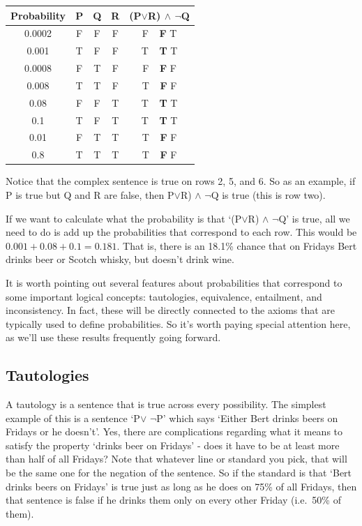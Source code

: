 \documentclass[]{tufte-book}
\begin{document}
\begin{longtable}[]{@{}ccccc@{}}
\toprule
Probability & P & Q & R & (P\(\vee\)R) \(\wedge\) \(\neg\)Q\tabularnewline
\midrule
\endhead
0.0002 & F & F & F & F \(~~\) \textbf{F} T\tabularnewline
0.001 & T & F & F & T \(~~\) \textbf{T} T\tabularnewline
0.0008 & F & T & F & F \(~~\) \textbf{F} F\tabularnewline
0.008 & T & T & F & T \(~~\) \textbf{F} F\tabularnewline
0.08 & F & F & T & T \(~~\) \textbf{T} T\tabularnewline
0.1 & T & F & T & T \(~~\) \textbf{T} T\tabularnewline
0.01 & F & T & T & T \(~~\) \textbf{F} F\tabularnewline
0.8 & T & T & T & T \(~~\) \textbf{F} F\tabularnewline
\bottomrule
\end{longtable}

Notice that the complex sentence is true on rows 2, 5, and 6. So as an example, if P is true but Q and R are false, then P\(\vee\)R) \(\wedge\) \(\neg\)Q is true (this is row two).

If we want to calculate what the probability is that `(P\(\vee\)R) \(\wedge\) \(\neg\)Q' is true, all we need to do is add up the probabilities that correspond to each row. This would be \(0.001+0.08+0.1 = 0.181\). That is, there is an 18.1\% chance that on Fridays Bert drinks beer or Scotch whisky, but doesn't drink wine.

It is worth pointing out several features about probabilities that correspond to some important logical concepts: tautologies, equivalence, entailment, and inconsistency. In fact, these will be directly connected to the axioms that are typically used to define probabilities. So it's worth paying special attention here, as we'll use these results frequently going forward.

\hypertarget{tautologies}{%
\subsection{Tautologies}\label{tautologies}}

A tautology is a sentence that is true across every possibility. The simplest example of this is a sentence `P\(\vee\) \(\neg\)P' which says `Either Bert drinks beers on Fridays or he doesn't'. Yes, there are complications regarding what it means to satisfy the property `drinks beer on Fridays' - does it have to be at least more than half of all Fridays? Note that whatever line or standard you pick, that will be the same one for the negation of the sentence. So if the standard is that `Bert drinks beers on Fridays' is true just as long as he does on 75\% of all Fridays, then that sentence is false if he drinks them only on every other Friday (i.e.~50\% of them).
\end{document}
